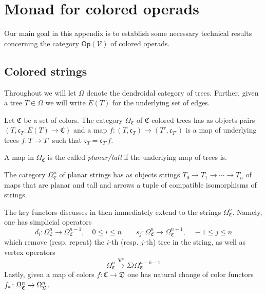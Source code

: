\documentclass[a4paper,10pt
,draft
]{article}%
\renewcommand{\1}{\eta}%
\begin{document}
\newpage



\appendix


\section{Monad for colored operads}
\label{MONAD_APDX}


Our main goal in this appendix is to establish some necessary technical results concerning the category $\mathsf{Op}(\mathcal{V})$ of colored operads.



\subsection{Colored strings}



Throughout we will let $\Omega$ denote the dendroidal category of trees.
Further, given a tree $T\in \Omega$ we will write 
$E(T)$ for the underlying set of edges.

\begin{definition}
Let $\mathfrak{C}$ be a set of colors.
The category $\Omega_{\mathfrak{C}}$ of $\mathfrak{C}$-colored trees has as objects pairs
$(T,\mathfrak{c}_T\colon E(T) \to \mathfrak{C})$ and a map
$f\colon (T,\mathfrak{c}_T) \to (T',\mathfrak{c}_{T'})$
is a map of underlying trees $f\colon T \to T'$
such that $\mathfrak{c}_T = \mathfrak{c}_{T'} f$.

A map in $\Omega_{\mathfrak{C}}$ is the called \textit{planar/tall} if the underlying map of trees is.

The category $\Omega_{\mathfrak{C}}^n$ of planar strings has as objects strings $T_0 \to T_1 \to \cdots \to T_n$ of maps that are planar and tall and arrows a tuple of compatible isomorphisms of strings.
\end{definition}


The key functors discusses in \cite{BP_geo} then immediately extend to the strings
$\Omega_{\mathfrak{C}}^n$. Namely, one has simplicial operators
\[
d_i \colon \Omega_{\mathfrak{C}}^n \to \Omega_{\mathfrak{C}}^{n-1},
\quad 0 \leq i \leq n
\qquad
s_j \colon \Omega_{\mathfrak{C}}^{n} \to \Omega_{\mathfrak{C}}^{n+1},
\quad -1 \leq j \leq n
\]
which remove (resp. repeat) the $i$-th (resp. $j$-th) tree in the string,
as well as vertex operators
\[
\Omega^{n}_{\mathfrak{C}}
\xrightarrow{\boldsymbol{V}^k}
\Sigma \wr \Omega^{n-k-1}_{\mathfrak{C}}
\]
Lastly, given a map of colors 
$f \colon \mathfrak{C} \to \mathfrak{D}$
one has natural change of color functors
$f_{\**} \colon \Omega^n_{\mathfrak{C}} \to \Omega^n_{\mathfrak{D}}$.
\end{document}
